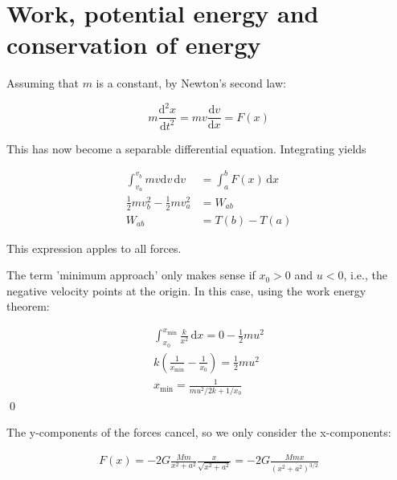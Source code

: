 \documentclass[12pt]{article}
\begin{document}
\pagebreak
\section*{Work, potential energy and conservation of energy}



Assuming that $m$ is a constant, by Newton's second law:

\begin{equation}
    m \frac{\mathrm{d}^{2}x}{\mathrm{d}t^{2}} = mv \frac{\mathrm{d}v}{\mathrm{d}x} = F(x)
\end{equation}

This has now become a separable differential equation. Integrating yields

\begin{equation}
\begin{split}
    \int_{v_{a}}^{v_{b}} mv \mathrm{d}v \, \mathrm{d}v &= \int_{a}^{b} F(x) \, \mathrm{d}x \\
    \frac{1}{2} m v_{b}^{2} - \frac{1}{2} m v_{a}^{2} &= W_{ab} \\
    W_{ab} &= T(b) - T(a)
\end{split}
\end{equation}

This expression apples to all forces.

The term 'minimum approach' only makes sense if $x_{0} > 0$ and $u < 0$, i.e., the negative velocity points at the origin. In this case, using the work energy theorem:

\begin{equation}
\begin{split}
    \int_{x_{0}}^{x_{\text{min}}} \frac{k}{x^{2}} \, \mathrm{d}x = 0 - \frac{1}{2} m u^{2} \\
    k \left( \frac{1}{x_{\text{min}}} - \frac{1}{x_{0}} \right) = \frac{1}{2} m u^{2} \\
    x_{\text{min}} = \frac{1}{mu^{2}/2k + 1/x_{0}}
\end{split}
\end{equation}
\qed



The y-components of the forces cancel, so we only consider the x-components:

\begin{equation}
\begin{split}
    F(x) = -2 G \frac{Mm}{x^{2} + a^{2}} \frac{x}{\sqrt{x^{2} + a^{2}}} = -2 G \frac{Mmx}{(x^{2} + a^{2})^{3/2}}
\end{split}
\end{equation}
\end{document}
